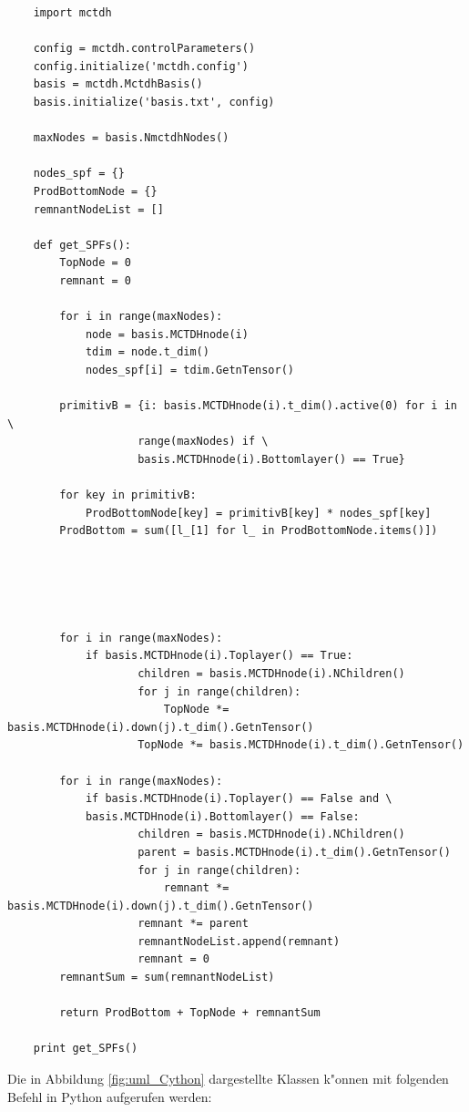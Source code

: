 \begin{verbatim}
    import mctdh

    config = mctdh.controlParameters()
    config.initialize('mctdh.config')
    basis = mctdh.MctdhBasis()
    basis.initialize('basis.txt', config)
    
    maxNodes = basis.NmctdhNodes()
    
    nodes_spf = {}
    ProdBottomNode = {}
    remnantNodeList = []
    
    def get_SPFs():
        TopNode = 0
        remnant = 0
    
        for i in range(maxNodes):
            node = basis.MCTDHnode(i)
            tdim = node.t_dim()
            nodes_spf[i] = tdim.GetnTensor() 
    
        primitivB = {i: basis.MCTDHnode(i).t_dim().active(0) for i in \
                    range(maxNodes) if \
                    basis.MCTDHnode(i).Bottomlayer() == True}
                    
        for key in primitivB:
            ProdBottomNode[key] = primitivB[key] * nodes_spf[key]
        ProdBottom = sum([l_[1] for l_ in ProdBottomNode.items()])
    




        for i in range(maxNodes):
            if basis.MCTDHnode(i).Toplayer() == True:
                    children = basis.MCTDHnode(i).NChildren()
                    for j in range(children):
                        TopNode *= basis.MCTDHnode(i).down(j).t_dim().GetnTensor()
                    TopNode *= basis.MCTDHnode(i).t_dim().GetnTensor()
    
        for i in range(maxNodes):
            if basis.MCTDHnode(i).Toplayer() == False and \
            basis.MCTDHnode(i).Bottomlayer() == False:
                    children = basis.MCTDHnode(i).NChildren()
                    parent = basis.MCTDHnode(i).t_dim().GetnTensor()
                    for j in range(children):
                        remnant *= basis.MCTDHnode(i).down(j).t_dim().GetnTensor() 
                    remnant *= parent
                    remnantNodeList.append(remnant)
                    remnant = 0
        remnantSum = sum(remnantNodeList)
    
        return ProdBottom + TopNode + remnantSum
    
    print get_SPFs()
\end{verbatim}


Die in Abbildung \ref{fig:uml_Cython} dargestellte Klassen k"onnen mit folgenden Befehl in Python aufgerufen werden:

